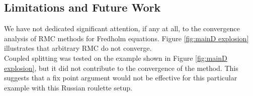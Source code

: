 \documentclass[a4paper,12pt]{article}
\begin{document}




\subsection{Limitations and Future Work}

We have not dedicated significant attention, if any at all, to
the convergence analysis of RMC methods
for Fredholm equations. Figure \ref{fig:mainD explosion} illustrates
that arbitrary RMC do not converge. \\

Coupled splitting was tested on the example shown in Figure
\ref{fig:mainD explosion}, but it did not contribute to the
convergence of the method. This suggests that a fix point argument
would not be effective for this particular example with this
Russian roulette setup. \\
\end{document}
